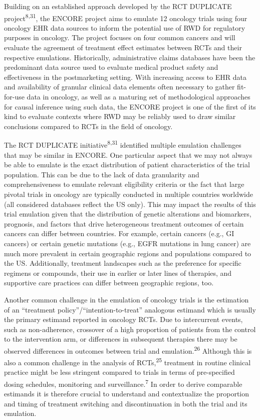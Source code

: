 \documentclass[
  letterpaper,
  DIV=11,
  numbers=noendperiod]{scrartcl}
\begin{document}
Building on an established approach developed by the RCT DUPLICATE
project\textsuperscript{8,31}, the ENCORE project aims to emulate 12
oncology trials using four oncology EHR data sources to inform the
potential use of RWD for regulatory purposes in oncology. The project
focuses on four common cancers and will evaluate the agreement of
treatment effect estimates between RCTs and their respective emulations.
Historically, administrative claims databases have been the predominant
data source used to evaluate medical product safety and effectiveness in
the postmarketing setting. With increasing access to EHR data and
availability of granular clinical data elements often necessary to
gather fit-for-use data in oncology, as well as a maturing set of
methodological approaches for causal inference using such data, the
ENCORE project is one of the first of its kind to evaluate contexts
where RWD may be reliably used to draw similar conclusions compared to
RCTs in the field of oncology.

The RCT DUPLICATE initiative\textsuperscript{8,31} identified multiple
emulation challenges that may be similar in ENCORE. One particular
aspect that we may not always be able to emulate is the exact
distribution of patient characteristics of the trial population. This
can be due to the lack of data granularity and comprehensiveness to
emulate relevant eligibility criteria or the fact that large pivotal
trials in oncology are typically conducted in multiple countries
worldwide (all considered databases reflect the US only). This may
impact the results of this trial emulation given that the distribution
of genetic alterations and biomarkers, prognosis, and factors that drive
heterogeneous treatment outcomes of certain cancers can differ between
countries. For example, certain cancers (e.g., GI cancers) or certain
genetic mutations (e.g., EGFR mutations in lung cancer) are much more
prevalent in certain geographic regions and populations compared to the
US. Additionally, treatment landscapes such as the preference for
specific regimens or compounds, their use in earlier or later lines of
therapies, and supportive care practices can differ between geographic
regions, too.

Another common challenge in the emulation of oncology trials is the
estimation of an ``treatment policy''/``intention-to-treat'' analogous
estimand which is usually the primary estimand reported in oncology
RCTs. Due to intercurrent events, such as non-adherence, crossover of a
high proportion of patients from the control to the intervention arm, or
differences in subsequent therapies there may be observed differences in
outcomes between trial and emulation.\textsuperscript{26} Although this
is also a common challenge in the analysis of RCTs,\textsuperscript{25}
treatment in routine clinical practice might be less stringent compared
to trials in terms of pre-specified dosing schedules, monitoring and
surveillance.\textsuperscript{7} In order to derive comparable estimands
it is therefore crucial to understand and contextualize the proportion
and timing of treatment switching and discontinuation in both the trial
and its emulation.
\end{document}
